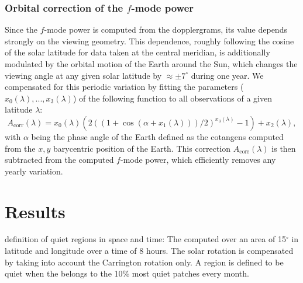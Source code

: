 \documentclass{aa}
\begin{document}
\subsubsection*{Orbital correction of the $f$-mode power}

Since the $f$-mode power is computed from the \los{} dopplergrams, its value depends strongly on the viewing geometry. This dependence,  roughly following the cosine of the solar latitude for data taken at the central meridian, is additionally modulated by the orbital motion of the Earth around the Sun, which changes the viewing angle at any given solar latitude by $\approx\pm7^\circ$ during one year. We compensated for this periodic variation by fitting the parameters ($x_0(\lambda), ..., x_3(\lambda)$) of the following function to all observations of a given latitude $\lambda$:
\begin{equation}
\label{eq:orbitcorr}
A_{\mbox{corr}}(\lambda) = x_0(\lambda) (  2 ( (1+\cos(\alpha+x_1(\lambda)))/2)^{x_3(\lambda)}-1   )+ x_2(\lambda),
\end{equation}
with $\alpha$ being the phase angle of the Earth defined as the cotangens computed from the $x,y$ barycentric position of the Earth.
This correction $A_{\mbox{corr}}(\lambda)$ is then subtracted from the computed $f$-mode power, which efficiently removes any yearly variation. 




\section{Results}





definition of quiet regions in space and time: 
The \brms{} computed over an area of 15$^\circ$ in latitude and longitude over a time of 8 hours. The solar rotation is compensated by taking into account the Carrington rotation only. A region is defined to be quiet when the \brms{} belongs to the 10\% most quiet patches every month.

\end{document}
